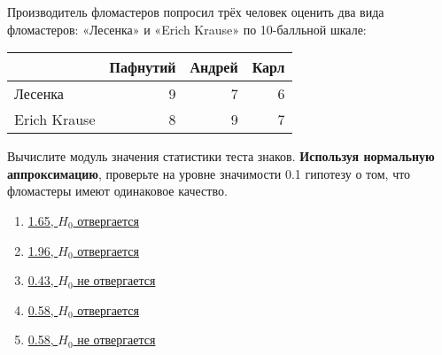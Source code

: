\documentclass[t]{beamer}
\begin{document}
 \begin{frame} \label{25} 
\begin{block}{25} 

  Производитель фломастеров попросил трёх человек оценить два вида фломастеров: «Лесенка» и «Erich Krause» по 10-балльной шкале:

\begin{center}
\begin{tabular}{lrrr} \toprule
 & Пафнутий  & Андрей & Карл \\
\midrule
Лесенка & 9 & 7 & 6 \\
Erich Krause & 8 & 9 & 7 \\
\bottomrule
\end{tabular}
\end{center}

Вычислите модуль значения статистики теста знаков. \textbf{Используя нормальную аппроксимацию}, проверьте на уровне значимости 0.1 гипотезу о том, что фломастеры имеют одинаковое качество.

  


 \end{block} 
\begin{enumerate} 
\item[] \hyperlink{25-No}{\beamergotobutton{} 1.65, $H_0$ отвергается}
\item[] \hyperlink{25-No}{\beamergotobutton{} 1.96, $H_0$ отвергается}
\item[] \hyperlink{25-No}{\beamergotobutton{} 0.43, $H_0$ не отвергается}
\item[] \hyperlink{25-No}{\beamergotobutton{} 0.58, $H_0$ отвергается}
\item[] \hyperlink{25-Yes}{\beamergotobutton{} 0.58, $H_0$ не отвергается}
\end{enumerate} 
\end{frame} 
\end{document}
